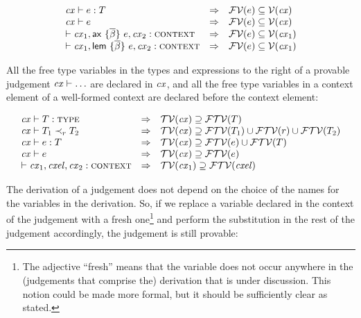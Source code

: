 \begin{theorem}\label{thm-free-var-in-cx}
\[
\begin{array}{l@{\ \ \IMPLIES\ \ }l}
\hastyO{\expr}{\typ}     & \efvar{\expr}\subseteq\cxvarO       \\
\theoO{\expr}            & \efvar{\expr}\subseteq\cxvarO       \\
\cxwf{\cx_1,\axO, \cx_2} & \efvar{\expr}\subseteq\cxvar{\cx_1} \\
\cxwf{\cx_1,\lemO,\cx_2} & \efvar{\expr}\subseteq\cxvar{\cx_1}
\end{array}
\]
\end{theorem}



All the free type variables in the types and expressions to the right of a
provable judgement $\mathit{cx}\vdash\ldots$ are declared in $\mathit{cx}$, and all the free
type variables in a context element of a well-formed context are declared
before the context element:

\begin{theorem}\label{thm-free-tvar-in-cx}
\[
\begin{array}{l@{\ \ \IMPLIES\ \ }l}
\istyO{\typ} &
 \cxtvarO\supseteq\ftvar{\typ} \\
\issubO{\typ_1}{\tspred}{\typ_2} &
 \cxtvarO\supseteq\ftvar{\typ_1}\cup\ftvar{\tspred}\cup\ftvar{\typ_2} \\
\hastyO{\expr}{\typ} &
 \cxtvarO\supseteq\ftvar{\expr}\cup\ftvar{\typ} \\
\theoO{\expr} &
 \cxtvarO\supseteq\ftvar{\expr} \\
\cxwf{\cx_1,\cxel,\cx_2} &
 \cxtvar{\cx_1}\supseteq\ftvar{\cxel}
\end{array}
\]
\end{theorem}

The derivation of a judgement does not depend on the choice of the names for
the variables in the derivation. So, if we replace a variable declared in the
context of the judgement with a fresh one\footnote{The adjective ``fresh''
means that the variable does not occur anywhere in the (judgements that
comprise the) derivation that is under discussion. This notion could be made
more formal, but it should be sufficiently clear as stated.} and perform the
substitution in the rest of the judgement accordingly, the judgement is still
provable:

